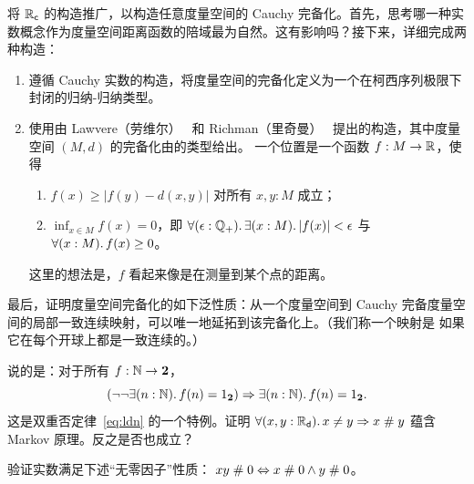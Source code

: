 \begin{ex} \label{ex:metric-completion}
  将 $\mathbb{R}_\mathsf{c}$ 的构造推广，以构造任意度量空间的 Cauchy 完备化。首先，思考哪一种实数概念作为度量空间距离函数的陪域最为自然。这有影响吗？接下来，详细完成两种构造：
  \begin{enumerate}
  \item 遵循 Cauchy 实数的构造，将度量空间的完备化定义为一个在柯西序列极限下封闭的归纳-归纳类型。
  \item 使用由 Lawvere（劳维尔）~\cite{lawvere:metric-spaces} 和 Richman（里奇曼）~\cite{Richman00thefundamental} 提出的构造，其中度量空间 $(M, d)$ 的完备化由的类型给出。
    一个位置是一个函数 $f : M \to \mathbb{R}$，使得
    \begin{enumerate}
    \item $f(x) \geq |f(y) - d(x,y)|$ 对所有 $x, y : M$ 成立；
    \item $\inf_{x \in M} f(x) = 0$，即 $\fall{\epsilon : \Qp} \exis{x : M} |f(x)| < \epsilon$ 与 $\fall{x : M} f(x) \geq 0$。
    \end{enumerate}
    这里的想法是，$f$ 看起来像是在测量到某个点的距离。
  \end{enumerate}
  最后，证明度量空间完备化的如下泛性质：从一个度量空间到 Cauchy 完备度量空间的局部一致连续映射，可以唯一地延拓到该完备化上。（我们称一个映射是
  如果它在每个开球上都是一致连续的。）
\end{ex}

%

\begin{ex} \label{ex:reals-apart-neq-MP}
  说的是：对于所有 $f : \mathbb{N} \to \mathbf{2}$，
  \begin{equation*}
    (\lnot \lnot \exis{n : \nat} f(n) = \btrue)
    \Rightarrow
    \exis{n : \nat} f(n) = \btrue.
  \end{equation*}
  这是双重否定律~\eqref{eq:ldn} 的一个特例。证明
  $\fall{x, y: \RD} x \neq y \Rightarrow x \apart y$ 蕴含 Markov 原理。反之是否也成立？
\end{ex}

\begin{ex} \label{ex:reals-apart-zero-divisors}
  验证实数满足下述“无零因子”性质：
  $x y \mathrel{\#} 0 \Leftrightarrow x \mathrel{\#} 0 \land y \mathrel{\#} 0$。
\end{ex}

